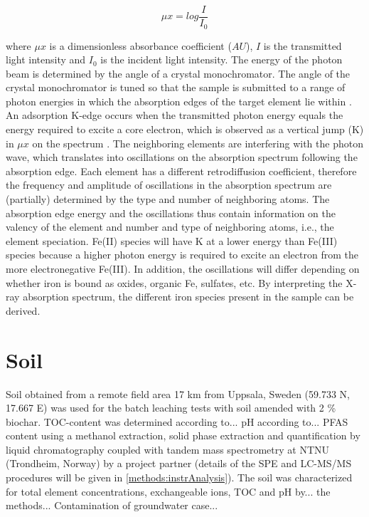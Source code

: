 \begin{equation}\label{eq:absorbance}
    \mu x = log \frac{I}{I_0}
\end{equation}

where $\mu x$ is a dimensionless absorbance coefficient ($AU$), $I$ is the transmitted light intensity and $I_0$ is the incident light intensity. The energy of the photon beam is determined by the angle of a crystal monochromator. The angle of the crystal monochromator is tuned so that the sample is submitted to a range of photon energies in which the absorption edges of the target element lie within \citep{vlaica2004exafs}. An adsorption K-edge occurs when the transmitted photon energy equals the energy required to excite a core electron, which is observed as a vertical jump (K) in $\mu x$ on the spectrum \citep{vlaica2004exafs}. The neighboring elements are interfering with the photon wave, which translates into oscillations on the absorption spectrum following the absorption edge. Each element has a different retrodiffusion coefficient, therefore the frequency and amplitude of oscillations in the absorption spectrum are (partially) determined by the type and number of neighboring atoms. The absorption edge energy and the oscillations thus contain information on the valency of the element and number and type of neighboring atoms, i.e., the element speciation. Fe(II) species will have K at a lower energy than Fe(III) species because a higher photon energy is required to excite an electron from the more electronegative Fe(III). In addition, the oscillations will differ depending on whether iron is bound as oxides, organic Fe, sulfates, etc. By interpreting the X-ray absorption spectrum, the different iron species present in the sample can be derived.

\section{Soil}
Soil obtained from a remote field area 17 km from Uppsala, Sweden (59.733 N, 17.667 E) was used for the batch leaching tests with soil amended with 2 \% biochar. TOC-content was determined according to... pH according to... PFAS content using a methanol extraction, solid phase extraction and quantification by liquid chromatography coupled with tandem mass spectrometry at NTNU (Trondheim, Norway) by a project partner (details of the SPE and LC-MS/MS procedures will be given in \cref{methods:instrAnalysis}). The soil was characterized for total element concentrations, exchangeable ions, TOC and pH by... the methods... Contamination of groundwater case...

